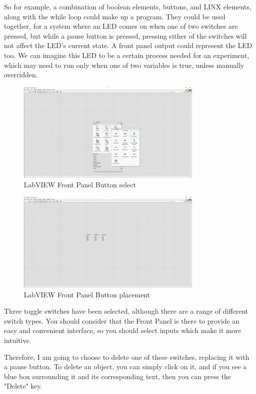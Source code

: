 \documentclass[a4paper,11pt]{report}
\begin{document}
So for example, a combination of boolean elements, buttons, and LINX elements, along with the while loop could make up a program. They could be used together, for a system where an LED comes on when one of two switches are pressed, but while a pause button is pressed, pressing either of the switches will not affect the LED's current state. A front panel output could represent the LED too. We can imagine this LED to be a certain process needed for an experiment, which may need to run only when one of two variables is true, unless manually overridden.

\begin{figure}[H]
\centering
\includegraphics[width=0.8\textwidth]{screenshots/labview10}
\caption{LabVIEW Front Panel Button select}
\end{figure}

\begin{figure}[H]
\centering
\includegraphics[width=0.8\textwidth]{screenshots/labview11}
\caption{LabVIEW Front Panel Button placement}
\end{figure}

Three toggle switches have been selected, although there are a range of different switch types. You should consider that the Front Panel is there to provide an easy and convenient interface, so you should select inputs which make it more intuitive.

Therefore, I am going to choose to delete one of these switches, replacing it with a pause button. To delete an object, you can simply click on it, and if you see a blue box surrounding it and its corresponding text, then you can press the "Delete" key.
\end{document}
